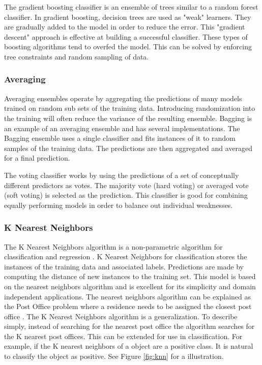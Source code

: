 \par
The gradient boosting classifier is an ensemble of trees similar to a random forest classifier.
In gradient boosting, decision trees are used as "weak" learners.
They are gradually added to the model in order to reduce the error.
This "gradient descent" approach is effective at building a successful classifier.
These types of boosting algorithms tend to overfed the model.
This can be solved by enforcing tree constraints and random sampling of data.


\subsubsection{Averaging}
Averaging ensembles operate by aggregating the predictions of many models trained on random sub sets of the training data.
Introducing randomization into the training will often reduce the variance of the resulting ensemble.
Bagging is an example of an averaging ensemble and has several implementations.
The Bagging ensemble uses a single classifier and fits instances of it to random samples of the training data.
The predictions are then aggregated and averaged for a final prediction.

The voting classifier works by using the predictions of a set of conceptually different predictors as votes.
The majority vote (hard voting) or averaged vote (soft voting) is selected as the prediction.
This classifier is good for combining equally performing models in order to balance out individual weaknesses.

\subsubsection{K Nearest Neighbors}
The K Nearest Neighbors algorithm is a non-parametric algorithm for classification and regression \cite{altman1992introduction}.
K Nearest Neighbors for classification stores the instances of the training data and associated labels.
Predictions are made by computing the distance of new instances to the training set.
This model is based on the nearest neighbors algorithm and is excellent for its simplicity and domain independent applications.
The nearest neighbors algorithm can be explained as the Post Office problem where a residence needs to be assigned the closest post office \cite{knuth1997art}.
The K Nearest Neighbors algorithm is a generalization.
To describe simply, instead of searching for the nearest post office the algorithm searches for the K nearest post offices.
This can be extended for use in classification.
For example, if the K nearest neighbors of a object are a positive class. 
It is natural to classify the object as positive.
See Figure \ref{fig:knn} for a illustration.

